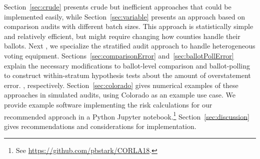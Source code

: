 \documentclass[runningheads]{llncs}
\begin{document}
Section~\ref{sec:crude} presents crude but inefficient approaches that could be implemented easily, while
Section~\ref{sec:variable} presents an approach based on comparison audits with different batch sizes.
This approach is statistically simple and relatively efficient, but might require changing how counties
handle their ballots.
Next , we specialize the stratified audit approach to handle heterogeneous voting equipment.
Sections~\ref{sec:comparisonError} and~\ref{sec:ballotPollError} explain
the necessary modifications to ballot-level comparison and ballot-polling to construct within-stratum hypothesis tests about the amount of overstatement
error. , respectively. 
Section~\ref{sec:colorado} gives numerical examples of these approaches in simulated audits,
using Colorado as an example use case.
We provide example software implementing the risk calculations for
our recommended approach in a Python Jupyter notebook.\footnote{%
 See \url{https://github.com/pbstark/CORLA18}.
}
Section~\ref{sec:discussion} gives recommendations and
considerations for implementation.
\end{document}
